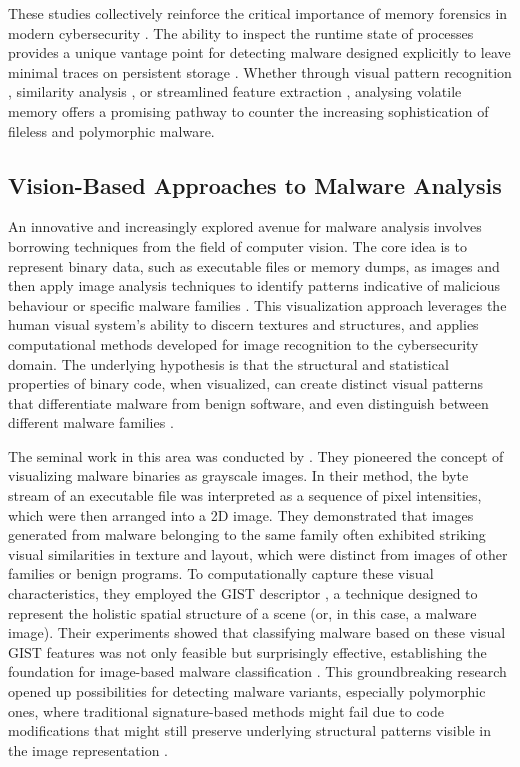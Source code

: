 These studies collectively reinforce the critical importance of memory forensics in modern cybersecurity \cite{sihwail2019malware}. The ability to inspect the runtime state of processes provides a unique vantage point for detecting malware designed explicitly to leave minimal traces on persistent storage \cite{sihag2021assistive, dai2018malware}. Whether through visual pattern recognition \cite{bozkir2021catch}, similarity analysis \cite{nissim2019volatile}, or streamlined feature extraction \cite{kara2022fileless}, analysing volatile memory offers a promising pathway to counter the increasing sophistication of fileless and polymorphic malware.

\subsection{Vision-Based Approaches to Malware Analysis}
\label{subsec:vision_based}

An innovative and increasingly explored avenue for malware analysis involves borrowing techniques from the field of computer vision. The core idea is to represent binary data, such as executable files or memory dumps, as images and then apply image analysis techniques to identify patterns indicative of malicious behaviour or specific malware families \cite{nataraj2011malware, bozkir2021catch}. This visualization approach leverages the human visual system's ability to discern textures and structures, and applies computational methods developed for image recognition to the cybersecurity domain. The underlying hypothesis is that the structural and statistical properties of binary code, when visualized, can create distinct visual patterns that differentiate malware from benign software, and even distinguish between different malware families \cite{nataraj2011malware}.

The seminal work in this area was conducted by \citet{nataraj2011malware}. They pioneered the concept of visualizing malware binaries as grayscale images. In their method, the byte stream of an executable file was interpreted as a sequence of pixel intensities, which were then arranged into a 2D image. They demonstrated that images generated from malware belonging to the same family often exhibited striking visual similarities in texture and layout, which were distinct from images of other families or benign programs. To computationally capture these visual characteristics, they employed the GIST descriptor \cite{oliva2001modeling}, a technique designed to represent the holistic spatial structure of a scene (or, in this case, a malware image). Their experiments showed that classifying malware based on these visual GIST features was not only feasible but surprisingly effective, establishing the foundation for image-based malware classification \cite{nataraj2011malware}. This groundbreaking research opened up possibilities for detecting malware variants, especially polymorphic ones, where traditional signature-based methods might fail due to code modifications that might still preserve underlying structural patterns visible in the image representation \cite{gibert2020rise}.

